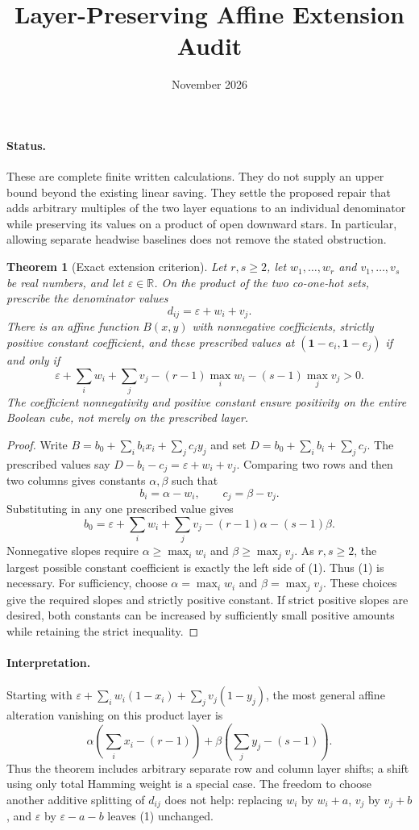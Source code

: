 \documentclass[11pt]{article}
\title{Layer-Preserving Affine Extension Audit}
\author{}
\date{November 2026}
\newtheorem{theorem}{Theorem}
\begin{document}
\maketitle

\paragraph{Status.}
These are complete finite written calculations. They do not supply an
upper bound beyond the existing linear saving. They settle the proposed
repair that adds arbitrary multiples of the two layer equations to an
individual denominator while preserving its values on a product of open
downward stars. In particular, allowing separate headwise baselines does
not remove the stated obstruction.

\begin{theorem}[Exact extension criterion]
Let $r,s\geq2$, let $w_1,\ldots,w_r$ and
$v_1,\ldots,v_s$ be real numbers, and let $\varepsilon\in\mathbb R$.
On the product of the two co-one-hot sets, prescribe the denominator
values
\[
 d_{ij}=\varepsilon+w_i+v_j.
\]
There is an affine function $B(x,y)$ with nonnegative coefficients,
strictly positive constant coefficient, and these prescribed values at
$(\mathbf1-e_i,\mathbf1-e_j)$ if and only if
\[
 \varepsilon+\sum_i w_i+\sum_j v_j
 -(r-1)\max_iw_i-(s-1)\max_jv_j>0.
 \tag{1}
\]
The coefficient nonnegativity and positive constant ensure positivity
on the entire Boolean cube, not merely on the prescribed layer.
\end{theorem}
\begin{proof}
Write $B=b_0+\sum_i b_i x_i+\sum_j c_jy_j$ and set
$D=b_0+\sum_i b_i+\sum_j c_j$. The prescribed values say
$D-b_i-c_j=\varepsilon+w_i+v_j$. Comparing two rows and
then two columns gives constants $\alpha,\beta$ such that
\[
 b_i=\alpha-w_i,\qquad c_j=\beta-v_j.
\]
Substituting in any one prescribed value gives
\[
 b_0=\varepsilon+\sum_iw_i+\sum_jv_j
       -(r-1)\alpha-(s-1)\beta.
\]
Nonnegative slopes require $\alpha\geq\max_iw_i$ and
$\beta\geq\max_jv_j$. As $r,s\geq2$, the largest possible
constant coefficient is exactly the left side of (1). Thus (1) is
necessary. For sufficiency, choose $\alpha=\max_iw_i$ and
$\beta=\max_jv_j$. These choices give the required slopes and
strictly positive constant. If strict positive slopes are desired, both
constants can be increased by sufficiently small positive amounts while
retaining the strict inequality.
\end{proof}

\paragraph{Interpretation.}
Starting with
$\varepsilon+\sum_iw_i(1-x_i)+\sum_jv_j(1-y_j)$, the most
general affine alteration vanishing on this product layer is
\[
 \alpha\left(\sum_i x_i-(r-1)\right)
 +\beta\left(\sum_j y_j-(s-1)\right).
\]
Thus the theorem includes arbitrary separate row and column layer
shifts; a shift using only total Hamming weight is a special case.
The freedom to choose another additive splitting of $d_{ij}$ does not
help: replacing $w_i$ by $w_i+a$, $v_j$ by $v_j+b$, and
$\varepsilon$ by $\varepsilon-a-b$ leaves (1) unchanged.
\end{document}

